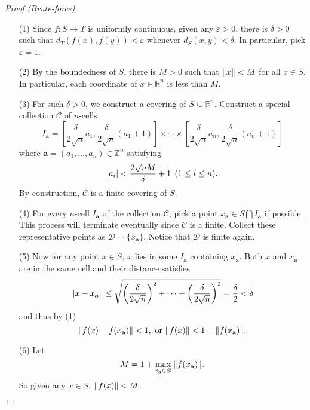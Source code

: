 \documentclass{article}
\begin{document}
\emph{Proof (Brute-force).}
\begin{enumerate}
\item[(1)]
Since $f: S \rightarrow T$ is uniformly continuous,
given any $\varepsilon > 0$, there is $\delta > 0$ such that
$d_T(f(x), f(y)) < \varepsilon$ whenever $d_S(x, y) < \delta$.
In particular, pick $\varepsilon = 1$.
\item[(2)]
By the boundedness of $S$, there is $M > 0$ such that $\norm{x} < M$ for all $x \in S$.
In particular, each coordinate of $x \in \mathbb{R}^n$ is less than $M$.
\item[(3)]
For such $\delta > 0$, we construct a covering of $S \subseteq \mathbb{R}^n$.
Construct a special collection $\mathscr{C}$ of $n$-cells
$$I_{\mathbf{a}} =
  \left[ \frac{\delta}{2\sqrt{n}}a_1, \frac{\delta}{2\sqrt{n}}(a_1+1) \right]
  \times
  \cdots
  \times
  \left[ \frac{\delta}{2\sqrt{n}}a_n, \frac{\delta}{2\sqrt{n}}(a_n+1) \right]
$$
where $\mathbf{a} = (a_1, ..., a_n) \in \mathbb{Z}^n$ satisfying
$$\abs{a_i} < \frac{2\sqrt{n}M}{\delta} + 1 \:\: (1 \leq i \leq n).$$
By construction, $\mathscr{C}$ is a finite covering of $S$.
\item[(4)]
For every $n$-cell $I_{\mathbf{a}}$ of the collection $\mathscr{C}$,
pick a point $x_{\mathbf{a}} \in S \bigcap I_{\mathbf{a}}$ if possible.
This process will terminate eventually since $\mathscr{C}$ is a finite.
Collect these representative points as $\mathscr{D} = \{ x_{\mathbf{a}} \}$.
Notice that $\mathscr{D}$ is finite again.
\item[(5)]
Now for any point $x \in S$, $x$ lies in some $I_{\mathbf{a}}$
containing $x_\mathbf{a}$.
Both $x$ and $x_\mathbf{a}$ are in the same cell and their distance satisfies
$$\norm{x - x_\mathbf{a}}
\leq \sqrt{
\left(\frac{\delta}{2\sqrt{n}}\right)^2 +
\cdots +
\left(\frac{\delta}{2\sqrt{n}}\right)^2}
= \frac{\delta}{2}
< \delta$$
and thus by (1)
$$\norm{f(x) - f(x_\mathbf{a})} < 1,
\text{ or }
\norm{f(x)} <  1 + \norm{f(x_\mathbf{a})}.$$
\item[(6)]
Let
$$M = 1 + \max_{x_\mathbf{a} \in \mathscr{D}} \norm{f(x_\mathbf{a})}.$$
So given any $x \in S$, $\norm{f(x)} < M$.
\end{enumerate}
$\Box$ \\
\end{document}
